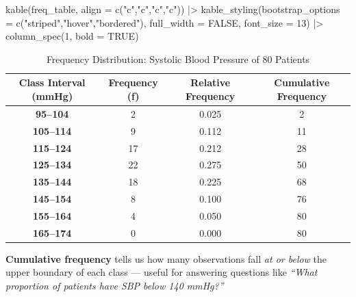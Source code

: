 \documentclass[
  12pt,
  letterpaper,
]{book}
\newenvironment{Shaded}{\begin{snugshade}}{\end{snugshade}}
\newcommand{\AttributeTok}[1]{\textcolor[rgb]{0.40,0.45,0.13}{#1}}
\newcommand{\ConstantTok}[1]{\textcolor[rgb]{0.56,0.35,0.01}{#1}}
\newcommand{\DecValTok}[1]{\textcolor[rgb]{0.68,0.00,0.00}{#1}}
\newcommand{\FunctionTok}[1]{\textcolor[rgb]{0.28,0.35,0.67}{#1}}
\newcommand{\NormalTok}[1]{\textcolor[rgb]{0.00,0.23,0.31}{#1}}
\newcommand{\SpecialCharTok}[1]{\textcolor[rgb]{0.37,0.37,0.37}{#1}}
\newcommand{\StringTok}[1]{\textcolor[rgb]{0.13,0.47,0.30}{#1}}
\begin{document}
\begin{tcolorbox}
\begin{Shaded}
\begin{Highlighting}[]
\FunctionTok{kable}\NormalTok{(freq\_table, }\AttributeTok{align =} \FunctionTok{c}\NormalTok{(}\StringTok{"c"}\NormalTok{,}\StringTok{"c"}\NormalTok{,}\StringTok{"c"}\NormalTok{,}\StringTok{"c"}\NormalTok{)) }\SpecialCharTok{|\textgreater{}}
  \FunctionTok{kable\_styling}\NormalTok{(}\AttributeTok{bootstrap\_options =} \FunctionTok{c}\NormalTok{(}\StringTok{"striped"}\NormalTok{,}\StringTok{"hover"}\NormalTok{,}\StringTok{"bordered"}\NormalTok{),}
                \AttributeTok{full\_width =} \ConstantTok{FALSE}\NormalTok{, }\AttributeTok{font\_size =} \DecValTok{13}\NormalTok{) }\SpecialCharTok{|\textgreater{}}
  \FunctionTok{column\_spec}\NormalTok{(}\DecValTok{1}\NormalTok{, }\AttributeTok{bold =} \ConstantTok{TRUE}\NormalTok{)}
\end{Highlighting}
\end{Shaded}

\begingroup\fontsize{13}{15}\selectfont

\begin{longtable}[t]{>{}cccc}

\caption{\label{tbl-cont-freq}Frequency Distribution: Systolic Blood
Pressure of 80 Patients}

\tabularnewline

\toprule
Class Interval (mmHg) & Frequency (f) & Relative Frequency & Cumulative Frequency\\
\midrule
\textbf{95–104} & 2 & 0.025 & 2\\
\textbf{105–114} & 9 & 0.112 & 11\\
\textbf{115–124} & 17 & 0.212 & 28\\
\textbf{125–134} & 22 & 0.275 & 50\\
\textbf{135–144} & 18 & 0.225 & 68\\
\addlinespace
\textbf{145–154} & 8 & 0.100 & 76\\
\textbf{155–164} & 4 & 0.050 & 80\\
\textbf{165–174} & 0 & 0.000 & 80\\
\bottomrule

\end{longtable}

\endgroup{}

\end{tcolorbox}

\textbf{Cumulative frequency} tells us how many observations fall
\emph{at or below} the upper boundary of each class --- useful for
answering questions like \emph{``What proportion of patients have SBP
below 140 mmHg?''}
\end{document}
